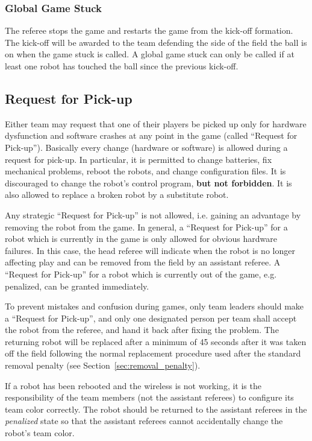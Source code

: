 \documentclass[12pt]{article}
\begin{document}
\subsubsection{Global Game Stuck}
\label{sec:game_stuck:global}

The referee stops the game and restarts the game from the kick-off formation. The kick-off will be awarded to the team defending the side of the field the ball is on when the game stuck is called. A global game stuck can only be called if at least one robot has touched the ball since the previous kick-off.

\subsection{Request for Pick-up}
\label{sec:request_for_pickup}

Either team may request that one of their players be picked up only for hardware dysfunction and software crashes at any point in the game (called ``Request for Pick-up''). 
Basically every change (hardware or software) is allowed during a request for pick-up. In particular,
it is permitted to change batteries, fix mechanical problems, reboot the robots, and change configuration files.
It is discouraged to change the robot's control program, \textbf{but not forbidden}.
It is also allowed to replace a broken robot by a substitute robot.

Any strategic ``Request for Pick-up'' is not allowed, i.e. gaining an advantage by removing the robot from the game.
In general, a ``Request for Pick-up'' for a robot which is currently in the game is only allowed for obvious hardware failures.
In this case, the head referee will indicate when the robot is no longer affecting play and can be removed from the field by an assistant referee.
A ``Request for Pick-up'' for a robot which is currently out of the game, e.g. penalized, can be granted immediately.

To prevent mistakes and confusion during games, only team leaders should make a ``Request for Pick-up'', and only one designated person per team shall accept the robot from the referee, and hand it back after fixing the problem.
The returning robot will be replaced after a minimum of 45 seconds after it was taken off the field following the normal replacement procedure used after the standard removal penalty (see Section~\ref{sec:removal_penalty}).

If a robot has been rebooted and the wireless is not working, it is the responsibility of the team members (not the assistant referees) to configure its team color correctly. The robot should be returned to the assistant referees in the \emph{penalized} state so that the assistant referees cannot accidentally change the robot's team color.
\end{document}

